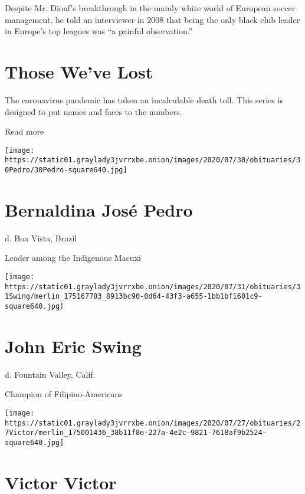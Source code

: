 Despite Mr. Diouf's breakthrough in the mainly white world of European
soccer management, he told an interviewer in 2008 that being the only
black club leader in Europe's top leagues was ``a painful observation.''

\href{https://www.nytimes3xbfgragh.onion/interactive/2020/obituaries/people-died-coronavirus-obituaries.html?action=click\&pgtype=Article\&state=default\&region=BELOW_MAIN_CONTENT\&context=covid_obits_promo}{}

\hypertarget{those-weve-lost}{%
\section{Those We've Lost}\label{those-weve-lost}}

The coronavirus pandemic has taken an incalculable death toll. This
series is designed to put names and faces to the numbers.

Read more

\texttt{[image: https://static01.graylady3jvrrxbe.onion/images/2020/07/30/obituaries/30Pedro/30Pedro-square640.jpg]}

\hypertarget{bernaldina-josuxe9-pedro}{%
\section{Bernaldina José Pedro}\label{bernaldina-josuxe9-pedro}}

d. Boa Vista, Brazil

Leader among the Indigenous Macuxi

\texttt{[image: https://static01.graylady3jvrrxbe.onion/images/2020/07/31/obituaries/31Swing/merlin\_175167783\_8913bc90-0d64-43f3-a655-1bb1bf1601c9-square640.jpg]}

\hypertarget{john-eric-swing}{%
\section{John Eric Swing}\label{john-eric-swing}}

d. Fountain Valley, Calif.

Champion of Filipino-Americans

\texttt{[image: https://static01.graylady3jvrrxbe.onion/images/2020/07/27/obituaries/27Victor/merlin\_175001436\_38b11f8e-227a-4e2c-9821-7618af9b2524-square640.jpg]}

\hypertarget{victor-victor}{%
\section{Victor Victor}\label{victor-victor}}

